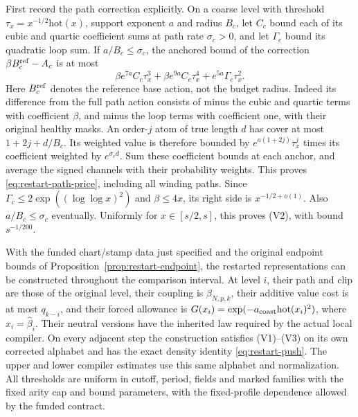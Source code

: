 First record the path correction explicitly. On a coarse level with
threshold $\tau_x=x^{-1/2}\mathrm{hot}(x)$, support exponent $a$ and
radius $B_c$, let $C_c$ bound each of its cubic and quartic coefficient
sums at path rate $\sigma_c>0$, and let $\Gamma_c$ bound its quadratic
loop sum. If $a/B_c\le\sigma_c$, the anchored bound of the correction
$\beta B_c^{\rm ref}-A_c$ is at most
\begin{equation}\label{eq:restart-path-price}
 \beta e^{7a}C_c\tau_x^3+
 \beta e^{9a}C_c\tau_x^4+e^{5a}\Gamma_c\tau_x^2.
\end{equation}
Here $B_c^{\rm ref}$ denotes the reference base action, not the budget
radius. Indeed its difference from the full path action consists of
minus the cubic and quartic terms with coefficient $\beta$, and minus
the loop terms with coefficient one, with their original healthy masks.
An order-$j$ atom of true length $d$ has cover at most $1+2j+d/B_c$.
Its weighted value is therefore bounded by
$e^{a(1+2j)}\tau_x^j$ times its coefficient weighted by
$e^{\sigma_cd}$. Sum these coefficient bounds at each anchor, and
average the signed channels with their probability weights. This proves
\eqref{eq:restart-path-price}, including all winding paths.
Since $\Gamma_c\le2\exp((\log\log x)^2)$ and $\beta\le4x$, its
right side is $x^{-1/2+o(1)}$. Also $a/B_c\le\sigma_c$ eventually.
Uniformly for $x\in[s/2,s]$, this proves (V2), with bound $s^{-1/200}$.

\begin{proposition}
\label{prop:restart-actual-closure}
With the funded chart/stamp data just specified and the original
endpoint bounds of Proposition~\ref{prop:restart-endpoint}, the
restarted representations can be constructed throughout the comparison
interval. At level $i$, their path and clip are those of the original
level, their coupling is $\beta_{N,p,k}$, their additive value cost is
at most $q_{k-i}$, and their forced allowance is
$G(x_i)=\exp(-a_{\rm coast}\mathrm{hot}(x_i)^2)$, where
$x_i=\widehat\beta_i$. Their neutral versions have the inherited law
required by the actual local compiler. On every adjacent step the
construction satisfies (V1)--(V3) on its own corrected alphabet and
has the exact density identity \eqref{eq:restart-push}. The upper and
lower compiler estimates use this same alphabet and normalization.
All thresholds are uniform in cutoff, period, fields and marked
families with the fixed arity cap and bound parameters, with the
fixed-profile dependence allowed by the funded contract.
\end{proposition}

